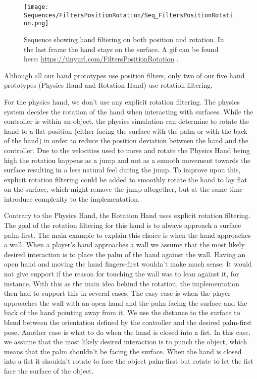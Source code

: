 \begin{figure}[H]
\centering
\texttt{[image: Sequences/FiltersPositionRotation/Seq\_FiltersPositionRotation.png]}
\caption{Sequence showing hand filtering on both position and rotation. In the last frame the hand stays on the surface. A gif can be found here: \url{https://tinyurl.com/FiltersPositionRotation} .}
\label{fig:filtersPositionRotation}
\end{figure}

Although all our hand prototypes use position filters, only two of our five hand prototypes (Physics Hand and Rotation Hand) use rotation filtering.

For the physics hand, we don't use any explicit rotation filtering. The physics system decides the rotation of the hand when interacting with surfaces. While the controller is within an object, the physics simulation can determine to rotate the hand to a flat position (either facing the surface with the palm or with the back of the hand) in order to reduce the position deviation between the hand and the controller. Due to the velocities used to move and rotate the Physics Hand being high the rotation happens as a jump and not as a smooth movement towards the surface resulting in a less natural feel during the jump. To improve upon this, explicit rotation filtering could be added to smoothly rotate the hand to lay flat on the surface, which might remove the jump altogether, but at the same time introduce complexity to the implementation.

Contrary to the Physics Hand, the Rotation Hand uses explicit rotation filtering. The goal of the rotation filtering for this hand is to always approach a surface palm-first. The main example to explain this choice is when the hand approaches a wall. When a player's hand approaches a wall we assume that the most likely desired interaction is to place the palm of the hand against the wall. Having an open hand and moving the hand fingers-first wouldn't make much sense. It would not give support if the reason for touching the wall was to lean against it, for instance. With this as the main idea behind the rotation, the implementation then had to support this in several cases. The easy case is when the player approaches the wall with an open hand and the palm facing the surface and the back of the hand pointing away from it. We use the distance to the surface to blend between the orientation defined by the controller and the desired palm-first pose. Another case is what to do when the hand is closed into a fist. In this case, we assume that the most likely desired interaction is to punch the object, which means that the palm shouldn't be facing the surface. When the hand is closed into a fist it shouldn't rotate to face the object palm-first but rotate to let the fist face the surface of the object.

